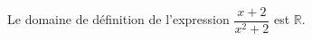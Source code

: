Le domaine de définition de l'expression $\dfrac{x+2}{x^2+2}$ est $\mathbb R$.

\begin{reponses}
\end{reponses}

